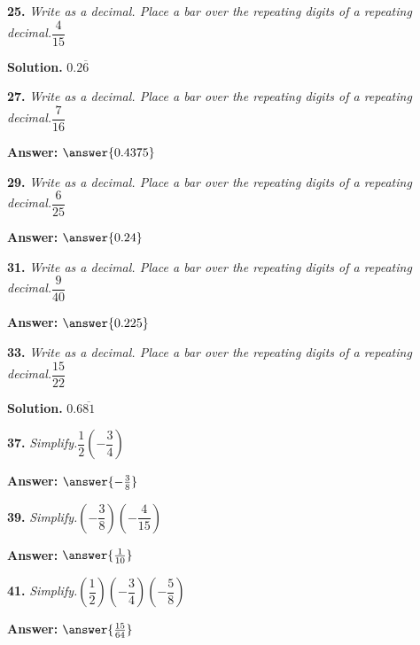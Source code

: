 \documentclass{ximera}
\begin{document}
\begin{problem}
\textbf{25.} \emph{Write as a decimal. Place a bar over the repeating digits of a repeating decimal.}\quad $\dfrac{4}{15}$

\begin{hint}
\textbf{Solution.} $0.2\overline{6}$
\end{hint}
\end{problem}

\begin{problem}
\textbf{27.} \emph{Write as a decimal. Place a bar over the repeating digits of a repeating decimal.}\quad $\dfrac{7}{16}$

\textbf{Answer:} $\answer{0.4375}$
\end{problem}

\begin{problem}
\textbf{29.} \emph{Write as a decimal. Place a bar over the repeating digits of a repeating decimal.}\quad $\dfrac{6}{25}$

\textbf{Answer:} $\answer{0.24}$
\end{problem}

\begin{problem}
\textbf{31.} \emph{Write as a decimal. Place a bar over the repeating digits of a repeating decimal.}\quad $\dfrac{9}{40}$

\textbf{Answer:} $\answer{0.225}$
\end{problem}

\begin{problem}
\textbf{33.} \emph{Write as a decimal. Place a bar over the repeating digits of a repeating decimal.}\quad $\dfrac{15}{22}$

\begin{hint}
\textbf{Solution.} $0.6\overline{81}$
\end{hint}
\end{problem}

\begin{problem}
\textbf{37.} \emph{Simplify.}\quad $\dfrac{1}{2}\left(-\dfrac{3}{4}\right)$

\textbf{Answer:} $\answer{-\frac{3}{8}}$
\end{problem}

\begin{problem}
\textbf{39.} \emph{Simplify.}\quad $\left(-\dfrac{3}{8}\right)\left(-\dfrac{4}{15}\right)$

\textbf{Answer:} $\answer{\frac{1}{10}}$
\end{problem}

\begin{problem}
\textbf{41.} \emph{Simplify.}\quad $\left(\dfrac{1}{2}\right)\left(-\dfrac{3}{4}\right)\left(-\dfrac{5}{8}\right)$

\textbf{Answer:} $\answer{\frac{15}{64}}$
\end{problem}
\end{document}
